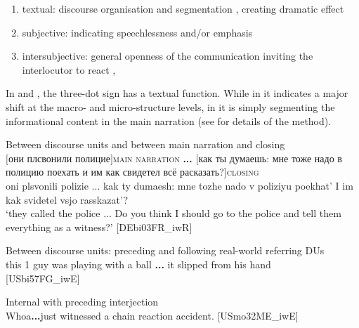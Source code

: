 \documentclass[output=paper,colorlinks,citecolor=brown]{langscibook}
\begin{document}
\begin{enumerate}
    \item textual: discourse organisation  and segmentation , creating dramatic effect 
    \item subjective: indicating speechlessness and/or emphasis 
    \item intersubjective: general openness of the communication inviting the interlocutor to react , 
\end{enumerate}

\noindent In  and , the three-dot sign has a textual function. While in  it indicates a major shift at the macro- and micro-structure levels, in  it is simply segmenting the informational content in the main narration (see \citealt[252--58]{labrenz_three-dot_2022} for details of the method).

\ea Between discourse units and between main narration and closing \label{ex:labrenzetal:5}\\
$[$они плсвонили полицие$]$\textsc{main narration} \textbf{...} $[$как ты думаешь: мне тоже надо в полицию поехать и им как свидетел всё расказать?$]$\textsc{closing}\\
{oni plsvonili polizie ... kak ty dumaesh: mne tozhe nado v poliziyu poekhat’ I im kak svidetel vsjo rasskazat’?} \\
\glt `they called the police ... Do you think I should go to the police and tell them everything as a witness?' \hfill[DEbi03FR\_iwR]
\z

\ea Between discourse units: preceding and following real-world referring DUs \label{ex:labrenzetal:6}\\ {this 1 guy was playing with a ball \textbf{...} it slipped from his hand} \\
\hfill[USbi57FG\_iwE]
\z

\ea Internal with preceding interjection \label{ex:labrenzetal:7}\\
{Whoa\textbf{...}just witnessed a chain reaction accident.} \hfill[USmo32ME\_iwE]
\z
\end{document}
